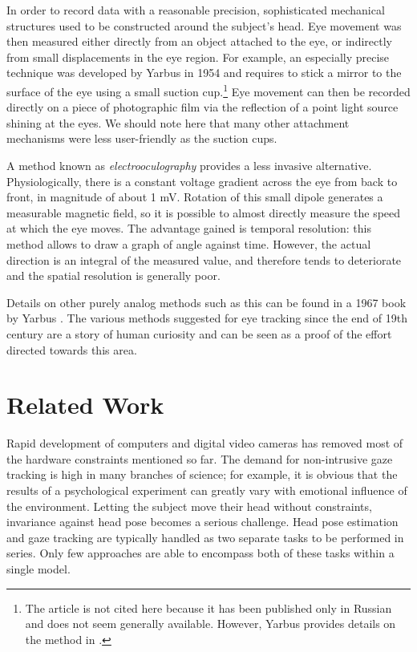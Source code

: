In order to record data with a reasonable precision, sophisticated mechanical structures used to be constructed around the subject's head.
Eye movement was then measured either directly from an object attached to the eye, or indirectly from small displacements in the eye region.
For example, an especially precise technique was developed by Yarbus in 1954 and requires to stick a mirror to the surface of the eye using a small suction cup.\footnote{
The article is not cited here because it has been published only in Russian and does not seem generally available.
However, Yarbus provides details on the method in \cite{yarbus67}.
}
Eye movement can then be recorded directly on a piece of photographic film via the reflection of a point light source shining at the eyes.
We should note here that many other attachment mechanisms were less user-friendly as the suction cups.

A method known as \textit{electrooculography} provides a less invasive alternative.
Physiologically, there is a constant voltage gradient across the eye from back to front, in magnitude of about 1 mV.
Rotation of this small dipole generates a measurable magnetic field, so it is possible to almost directly measure the speed at which the eye moves.
The advantage gained is temporal resolution: this method allows to draw a graph of angle against time.
However, the actual direction is an integral of the measured value, and therefore tends to deteriorate and the spatial resolution is generally poor.

Details on other purely analog methods such as this can be found in a 1967 book by Yarbus \cite{yarbus67}.
The various methods suggested for eye tracking since the end of 19th century are a story of human curiosity and can be seen as a proof of the effort directed towards this area.

\section{Related Work}

Rapid development of computers and digital video cameras has removed most of the hardware constraints mentioned so far.
The demand for non-intrusive gaze tracking is high in many branches of science; for example, it is obvious that the results of a psychological experiment can greatly vary with emotional influence of the environment.
Letting the subject move their head without constraints, invariance against head pose becomes a serious challenge.
Head pose estimation and gaze tracking are typically handled as two separate tasks to be performed in series.
Only few approaches are able to encompass both of these tasks within a single model.

